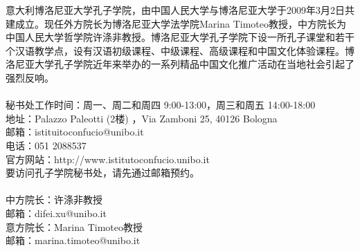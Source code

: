 意大利博洛尼亚大学孔子学院，由中国人民大学与博洛尼亚大学于2009年3月2日共建成立。现任外方院长为博洛尼亚大学法学院Marina Timoteo教授，中方院长为中国人民大学哲学院许涤非教授。博洛尼亚大学孔子学院下设一所孔子课堂和若干个汉语教学点，设有汉语初级课程、中级课程、高级课程和中国文化体验课程。博洛尼亚大学孔子学院近年来举办的一系列精品中国文化推广活动在当地社会引起了强烈反响。  \\
\noindent 
\\
秘书处工作时间：周一、周二和周四 9:00-13:00，周三和周五 14:00-18:00\\
地址：Palazzo Paleotti (2楼) ，Via Zamboni 25, 40126 Bologna\\
邮箱：istituitoconfucio@unibo.it\\
电话：051 2088537\\
官方网站：http://www.istitutoconfucio.unibo.it\\
要访问孔子学院秘书处，请先通过邮箱预约。\\
\\
中方院长：许涤非教授\\
邮箱：difei.xu@unibo.it\\
意方院长：Marina Timoteo教授\\
邮箱：marina.timoteo@unibo.it\\


